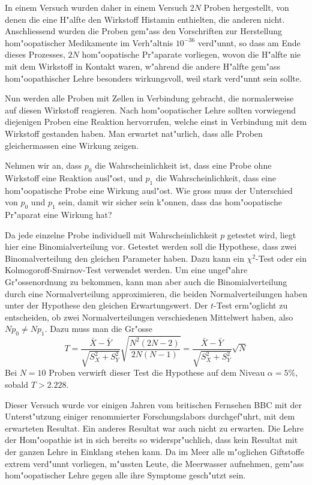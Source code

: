 In einem Versuch wurden daher in einem Versuch $2N$ Proben hergestellt,
von denen die eine H"alfte den Wirkstoff Histamin enthielten, die anderen 
nicht. Anschliessend wurden die Proben gem"ass den Vorschriften zur
Herstellung hom"oopatischer Medikamente im Verh"altnis $10^{-36}$
verd"unnt, so dass am Ende dieses Prozesses, $2N$ hom"oopatische
Pr"aparate vorliegen, wovon die H"alfte nie mit dem Wirkstoff in
Kontakt waren, w"ahrend die andere H"alfte gem"ass hom"oopathischer
Lehre besonders wirkungsvoll, weil stark verd"unnt sein sollte.

Nun werden alle Proben mit Zellen in Verbindung gebracht, die normalerweise
auf diesen Wirkstoff reagieren. Nach hom"oopatischer Lehre sollten vorwiegend
diejenigen Proben eine Reaktion hervorrufen, welche einst in Verbindung
mit dem Wirkstoff gestanden haben. Man erwartet nat"urlich, dass 
alle Proben gleichermassen eine Wirkung zeigen.

Nehmen wir an, dass $p_0$ die Wahrscheinlichkeit ist, dass eine Probe ohne
Wirkstoff eine Reaktion ausl"ost, und $p_1$ die Wahrscheinlichkeit, dass
eine hom"oopatische Probe eine Wirkung ausl"ost. Wie gross muss der Unterschied
von $p_0$ und $p_1$ sein, damit wir sicher sein k"onnen, dass das hom"oopatische
Pr"aparat eine Wirkung hat?

Da jede einzelne Probe individuell mit Wahrscheinlichkeit $p$ getestet wird, liegt
hier eine Binomialverteilung vor. Getestet werden soll die Hypothese, dass zwei
Binomalverteilung den gleichen Parameter haben. Dazu kann ein $\chi^2$-Test oder
ein Kolmogoroff-Smirnov-Test verwendet werden. Um eine ungef"ahre Gr"ossenordnung
zu bekommen, kann man aber auch die Binomialverteilung durch eine Normalverteilung
approximieren, die beiden Normalverteilungen haben unter der Hypothese den
gleichen Erwartungswert.
Der $t$-Test erm"oglicht zu entscheiden, ob zwei Normalverteilungen
verschiedenen Mittelwert haben, also $Np_0\ne Np_1$. Dazu muss man die
Gr"osse
$$T=\frac{\bar X - \bar Y}{\sqrt{S_X^2+S_Y^2}}\sqrt{\frac{N^2(2N-2)}{{2N}{(N-1)}}}
=
\frac{\bar X - \bar Y}{\sqrt{S_X^2+S_Y^2}}\sqrt{N}$$
Bei $N=10$ Proben verwirft dieser Test die Hypothese
auf dem Niveau $\alpha=5\%$, sobald
$T>2.228$.

Dieser Versuch wurde vor einigen Jahren vom britischen Fernsehen BBC mit der
Unterst"utzung einiger renommierter Forschungslabors durchgef"uhrt, mit dem
erwarteten Resultat.
Ein anderes Resultat war auch nicht zu erwarten. Die Lehre der Hom"oopathie
ist in sich bereits so widerspr"uchlich, dass kein Resultat mit der ganzen
Lehre in Einklang stehen kann.
Da im Meer alle m"oglichen Giftstoffe extrem verd"unnt vorliegen, m"ussten
Leute, die Meerwasser aufnehmen, gem"ass hom"oopatischer Lehre gegen alle
ihre Symptome gesch"utzt sein.

